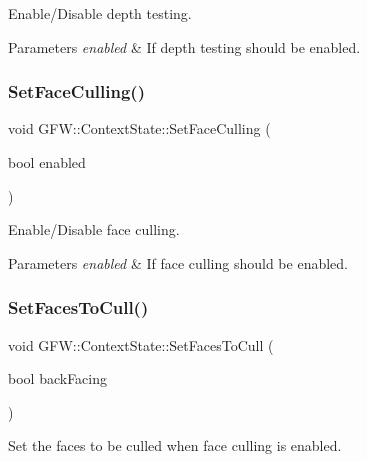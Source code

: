 Enable/\+Disable depth testing. 


\begin{DoxyParams}{Parameters}
{\em enabled} & If depth testing should be enabled. \\
\hline
\end{DoxyParams}
\mbox{\label{class_g_f_w_1_1_context_state_a273f8e3a54f461c3bb50ba55e0ff21bd}} 
\subsubsection{\texorpdfstring{Set\+Face\+Culling()}{SetFaceCulling()}}
{\footnotesize\ttfamily void G\+F\+W\+::\+Context\+State\+::\+Set\+Face\+Culling (\begin{DoxyParamCaption}\item[{bool}]{enabled }\end{DoxyParamCaption})}



Enable/\+Disable face culling. 


\begin{DoxyParams}{Parameters}
{\em enabled} & If face culling should be enabled. \\
\hline
\end{DoxyParams}
\mbox{\label{class_g_f_w_1_1_context_state_a1faffa6e3a9eb8f1974f8ed122b773b0}} 
\subsubsection{\texorpdfstring{Set\+Faces\+To\+Cull()}{SetFacesToCull()}}
{\footnotesize\ttfamily void G\+F\+W\+::\+Context\+State\+::\+Set\+Faces\+To\+Cull (\begin{DoxyParamCaption}\item[{bool}]{back\+Facing }\end{DoxyParamCaption})}



Set the faces to be culled when face culling is enabled. 


